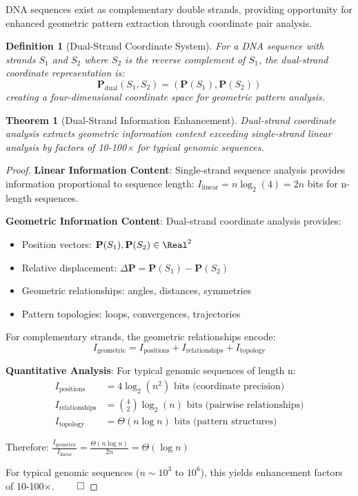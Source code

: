\documentclass[12pt,a4paper]{article}
\newtheorem{theorem}{Theorem}
\newtheorem{definition}{Definition}
\begin{document}
DNA sequences exist as complementary double strands, providing opportunity for enhanced geometric pattern extraction through coordinate pair analysis.

\begin{definition}[Dual-Strand Coordinate System]
For a DNA sequence with strands $S_1$ and $S_2$ where $S_2$ is the reverse complement of $S_1$, the dual-strand coordinate representation is:
\begin{equation}
\mathbf{P}_{\text{dual}}(S_1, S_2) = (\mathbf{P}(S_1), \mathbf{P}(S_2))
\end{equation}
creating a four-dimensional coordinate space for geometric pattern analysis.
\end{definition}

\begin{theorem}[Dual-Strand Information Enhancement]
\label{thm:dual_strand_info}
Dual-strand coordinate analysis extracts geometric information content exceeding single-strand linear analysis by factors of 10-100× for typical genomic sequences.
\end{theorem}

\begin{proof}
\textbf{Linear Information Content}: Single-strand sequence analysis provides information proportional to sequence length: $I_{\text{linear}} = n \log_2(4) = 2n$ bits for n-length sequences.

\textbf{Geometric Information Content}: Dual-strand coordinate analysis provides:
\begin{itemize}
\item Position vectors: $\mathbf{P}(S_1), \mathbf{P}(S_2) \in \Real^2$
\item Relative displacement: $\Delta\mathbf{P} = \mathbf{P}(S_1) - \mathbf{P}(S_2)$
\item Geometric relationships: angles, distances, symmetries
\item Pattern topologies: loops, convergences, trajectories
\end{itemize}

For complementary strands, the geometric relationships encode:
\begin{equation}
I_{\text{geometric}} = I_{\text{positions}} + I_{\text{relationships}} + I_{\text{topology}}
\end{equation}

\textbf{Quantitative Analysis}: For typical genomic sequences of length n:
\begin{align}
I_{\text{positions}} &= 4 \log_2(n^2) \text{ bits (coordinate precision)} \\
I_{\text{relationships}} &= \binom{4}{2} \log_2(n) \text{ bits (pairwise relationships)} \\
I_{\text{topology}} &= \Theta(n \log n) \text{ bits (pattern structures)}
\end{align}

Therefore: $\frac{I_{\text{geometric}}}{I_{\text{linear}}} = \frac{\Theta(n \log n)}{2n} = \Theta(\log n)$

For typical genomic sequences ($n \sim 10^3$ to $10^6$), this yields enhancement factors of 10-100×. $\qed$
\end{proof}
\end{document}
